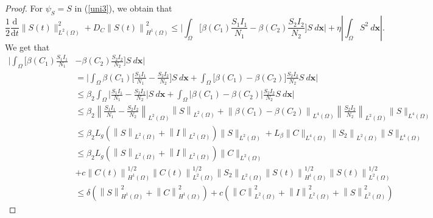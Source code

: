 \documentclass[10pt,a4paper]{amsart}
\begin{document}
\begin{proof}
		\noindent For $\psi_S=S$ in (\ref{uni3}), we obtain that 
		\begin{equation}\label{estmS0}
			\displaystyle \frac{1}{2}\frac{\mathrm{d}}{\mathrm{d} t}\|S(t)\|_{L^2(\Omega)}^{2}+D_C\left\|S(t)\right\|_{H^{1}(\Omega)}^{2}\leq  \Big|\int_{\Omega}\Big[\beta(C_1)\frac{S_1 I_1}{N_1}-\beta(C_2)\frac{S_2 I_2}{N_2}\Big] S~d{\mathbf{x}}\Big| +\eta\left|\int_{\Omega} S^2~d{\mathbf{x}} \right|.
		\end{equation}
		We get that
		\begin{equation*}
			\begin{split}
				\Big|\int_{\Omega}\Big[\beta(C_1)\frac{S_1 I_1}{N_1}&-\beta(C_2)\frac{S_2 I_2}{N_2}\Big] S~d{\mathbf{x}}\Big|
				\\&=\Big|\int_{\Omega}\beta(C_1)\Big[\frac{S_1 I_1}{N_1}-\frac{S_2 I_2}{N_2}\Big] S~d{\mathbf{x}}+\int_{\Omega}\Big[\beta(C_1)-\beta(C_2)\Big]\frac{S_2 I_2}{N_2} S~d{\mathbf{x}}\Big|
				\\&\leq \beta_2\int_{\Omega}\Big|\frac{S_1 I_1}{N_1}-\frac{S_2 I_2}{N_2}\Big| S~d{\mathbf{x}}+\int_{\Omega}\Big|\beta(C_1)-\beta(C_2)\Big|\frac{S_2 I_2}{N_2} S~d{\mathbf{x}}\Big|
				\\&\leq\beta_2\left\|\frac{S_1 I_1}{N_1}-\frac{S_2 I_2}{N_2}\right\|_{L^{2}(\Omega)}\left\|S\right\|_{L^{2}(\Omega)}+ \left\|\beta(C_1)-\beta(C_2)\right\|_{L^{4}(\Omega)} \left\|\frac{S_2 I_2}{N_2}\right\|_{L^{2}(\Omega)} \|S\|_{L^{4}(\Omega)}
				\\&\leq \beta_2 L_g(\left\|S\right\|_{L^{2}(\Omega)}+\left\|I\right\|_{L^{2}(\Omega)})\|S\|_{L^{2}(\Omega)}+ L_{\beta}\|C\|_{L^{4}(\Omega)}\left\|S_2\right\|_{L^{2}(\Omega)} \|S\|_{L^{4}(\Omega)}
				\\&\leq \beta_2 L_g(\left\|S\right\|_{L^{2}(\Omega)}+\left\|I\right\|_{L^{2}(\Omega)})\|C\|_{L^{2}(\Omega)}
				\\
			    &+ c\left\|C(t)\right\|_{H^{1}(\Omega)}^{1/2}\left\|C(t)\right\|_{L^{2}(\Omega)}^{1/2}\left\|S_2\right\|_{L^{2}(\Omega)} \left\|S(t)\right\|_{H^{1}(\Omega)}^{1/2}\left\|S(t)\right\|_{L^{2}(\Omega)}^{1/2}
				\\&\leq \delta \left(\left\|S\right\|_{H^{1}(\Omega)}^2+\left\|C\right\|_{H^{1}(\Omega)}^2\right)+c\left( \left\|C\right\|_{L^{2}(\Omega)}^2+\left\|I\right\|_{L^{2}(\Omega)}^2+\left\|S\right\|_{L^{2}(\Omega)}^2\right)

\end{split}
\end{equation*}
\end{proof}
\end{document}
